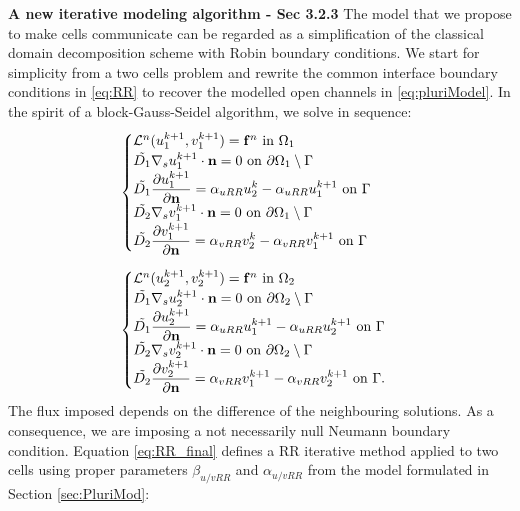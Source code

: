 \documentclass[a4paper]{siamart190516}
\begin{document}
\textbf{A new iterative modeling algorithm - Sec 3.2.3 }
The model that we propose to make cells communicate can be regarded as a simplification of the classical domain decomposition scheme with Robin boundary conditions. We start for simplicity from a two cells problem and rewrite the common interface boundary conditions in \eqref{eq:RR} to recover the modelled open channels in \eqref{eq:pluriModel}. In the spirit of a block-Gauss-Seidel algorithm, we solve in sequence:
\begin{equation} \label{eq:RR_final}
\begin{aligned}
& \begin{cases}
\mathcal{L}^n (u_1^{k+1}, v_1^{k+1}) = \mathbf{f}^n \ \text{in} \ \Omega_1 \\
\Tilde{D_1} \nabla_s u_1^{k+1} \cdot \mathbf{n} = 0 \ \text{on} \ \partial \Omega_1 \setminus \Gamma \\
\Tilde{D_1} \displaystyle{\partial u_1^{k+1}\over\partial \mathbf{n}} = \alpha_{uRR} u_2^{k} - \alpha_{uRR} u_1^{k+1} \ \text{on} \ \Gamma \\
\Tilde{D_2} \nabla_s v_1^{k+1} \cdot \mathbf{n} = 0 \ \text{on} \ \partial \Omega_1 \setminus \Gamma \\
\Tilde{D_2} \displaystyle{\partial v_1^{k+1}\over\partial \mathbf{n}} = \alpha_{vRR} v_2^{k} -\alpha_{vRR} v_1^{k+1} \ \text{on} \ \Gamma
\end{cases}
\\[6pt]
& \begin{cases}
\mathcal{L}^n (u_2^{k+1}, v_2^{k+1}) = \mathbf{f}^n \ \text{in} \ \Omega_2 \\
\Tilde{D_1} \nabla_s u_2^{k+1} \cdot \mathbf{n} = 0 \ \text{on} \ \partial \Omega_2 \setminus \Gamma \\
\Tilde{D_1} \displaystyle{\partial u_2^{k+1}\over\partial \mathbf{n}} = \alpha_{uRR} u_1^{k+1} - \alpha_{uRR} u_2^{k+1} \ \text{on} \ \Gamma \\
\Tilde{D_2} \nabla_s v_2^{k+1} \cdot \mathbf{n} = 0 \ \text{on} \ \partial \Omega_2 \setminus \Gamma\\
\Tilde{D_2} \displaystyle{\partial v_2^{k+1}\over\partial \mathbf{n}} = \alpha_{vRR} v_1^{k+1} -\alpha_{vRR} v_2^{k+1} \ \text{on} \ \Gamma.
\end{cases}
\end{aligned}\end{equation}
The flux imposed depends on the difference of the neighbouring solutions. As a consequence, we are imposing a not necessarily null Neumann boundary condition. Equation \eqref{eq:RR_final} defines a RR iterative method applied to two cells using proper parameters $\beta_{u/vRR}$ and $\alpha_{u/v RR}$ from the model formulated in Section \ref{sec:PluriMod}:
\end{document}
